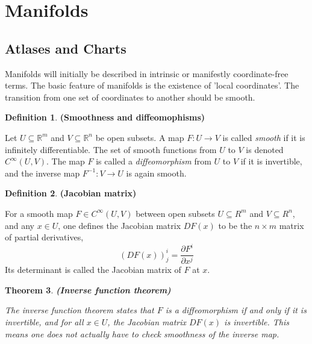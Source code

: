 \documentclass{article}
\newtheorem{theorem}{Theorem}[section]
\theoremstyle{definition}
\newtheorem{defn}[theorem]{Definition}
\newenvironment{definition}
  {\vspace{8pt}\begin{mdframed}[backgroundcolor=blueish,innertopmargin=4]\begin{defn}}
  {\end{defn}\end{mdframed}\vspace{4pt}}
\begin{document}
\section{Manifolds}
\subsection{Atlases and Charts}

Manifolds will initially be described in intrinsic or manifestly  coordinate-free terms. The basic feature of manifolds is the existence of 'local coordinates'. The transition from one set of coordinates to another should be smooth.
\begin{definition} \textbf{(Smoothness and diffeomophisms)}

Let $U \subseteq \mathbb R^m$ and $V \subseteq \mathbb R^n$ be open subsets. A map $F : U \rightarrow V$ is called \textit{smooth} if it is infinitely differentiable. The set of smooth functions from $U$ to $V$ is denoted $C^{\infty}(U,V)$. The map $F$ is called a \textit{diffeomorphism} from $U$ to $V$ if it is invertible, and the inverse map $F^{-1}: V \rightarrow U$ is again smooth.
\end{definition}


\begin{definition} \textbf{(Jacobian matrix)}

For a smooth map $F \in C^{\infty}(U,V)$ between open subsets $U \subseteq R^m$ and $V \subseteq R^n$, and any $x \in U$, one defines the Jacobian matrix $DF(x)$ to be the $n \times m$ matrix of partial derivatives,
\[
    (DF(x))^i_j = \frac{\partial F^i}{\partial x^j}
\]
Its determinant is called the Jacobian matrix of $F$ at $x$.
\end{definition}

\begin{theorem} \textbf{(Inverse function theorem)}

The inverse function theorem states that $F$ is a diffeomorphism if and only if it is invertible, and for all $x \in U$, the Jacobian matrix $DF(x)$ is invertible. This means one does not actually have to check smoothness of the inverse map.
\end{theorem}
\end{document}
